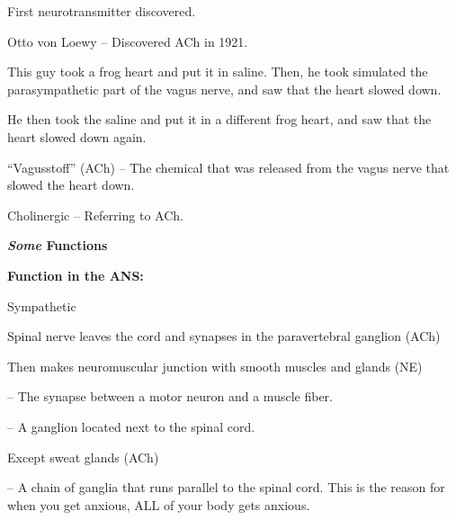 \begin{coloredlist}
    \item First neurotransmitter discovered.
    \begin{coloredlist}
        \item Otto von Loewy -- Discovered ACh in 1921.
        \begin{coloredlist}
            \item This guy took a frog heart and put it in saline. Then, he took simulated the parasympathetic part of the vagus nerve, and saw that the heart slowed down. 
            \item He then took the saline and put it in a different frog heart, and saw that the heart slowed down again.
            \item ``Vagusstoff'' (ACh) -- The chemical that was released from the vagus nerve that slowed the heart down.
            \item Cholinergic -- Referring to ACh.
        \end{coloredlist}
    \end{coloredlist}
    \item \textbf{\textit{Some} Functions}
    \begin{coloredlist}
        \item \textbf{Function in the ANS:}
        \begin{coloredlist}
            \item Sympathetic
            \begin{coloredlist}
                \item Spinal nerve leaves the cord and synapses in the paravertebral ganglion (ACh)
                \item Then makes neuromuscular junction with smooth muscles and glands (NE)
                \begin{coloredlist}
                    \item {} -- The synapse between a motor neuron and a muscle fiber.
                    \item {} -- A ganglion located next to the spinal cord.
                \end{coloredlist}
                \begin{coloredlist}
                    \item Except sweat glands (ACh)
                \end{coloredlist}
                \item {} -- A chain of ganglia that runs parallel to the spinal cord. This is the reason for when you get anxious, ALL of your body gets anxious.

\end{coloredlist}
\end{coloredlist}
\end{coloredlist}
\end{coloredlist}

